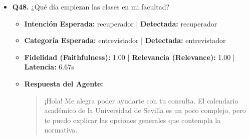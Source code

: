 \documentclass[12pt,a4paper,oneside]{report}
\begin{document}
\begin{itemize}
\begin{itemize}
\begin{quote}
¿Cuál es el tipo de curso que estás realizando (grado o máster)?
                \end{quote}
          \item \textbf{{Ground Truth (Referencia):}} \\
                \begin{quote}
Para poder indicarte el día exacto de inicio del periodo lectivo, necesito saber qué carrera o titulación estás cursando, ya que los calendarios específicos pueden variar según el centro o facultad.
                \end{quote}
          \item \textbf{{Referencias / Fuentes Utilizadas:}} \\
                \begin{itemize}
                  \item calendario-academico-2025-2026-cg.pdf (Página 2)
                  \item \href{https://cat.us.es/noticias/calendario-academico-curso-2024-25}{Calendario Académico Curso 2024-25 | Centro de Atención...}
                  \item \href{https://cat.us.es/noticias/calendario-academico-curso-2026-27}{Calendario Académico curso 2026-27 | Centro de Atención...}
                  \item calendario-academico-2025-2026-cg.pdf (Página 7)
                  \item calendario-academico-2025-2026-cg.pdf (Página 3)
                  \item \href{https://cat.us.es/noticias/calendario-academico-curso-2025-26}{Calendario Académico curso 2025-26 | Centro de Atención...}
                  \item matrícula 2025-26 (MATRUX)-v2\_020722025.pdf (Página 12)
                \end{itemize}
        \end{itemize}

  
\item \textbf{Q48.} ¿Qué día empiezan las clases en mi facultad? \\
        \begin{itemize}
          \item \textbf{Intención Esperada:} recuperador | \textbf{Detectada:} recuperador
          \item \textbf{Categoría Esperada:} entrevistador | \textbf{Detectada:} entrevistador
          \item \textbf{Fidelidad (Faithfulness):} 1.00 | \textbf{Relevancia (Relevance):} 1.00 | \textbf{Latencia:} 6.67s
          \item \textbf{{Respuesta del Agente:}} \\
                \begin{quote}
¡Hola! Me alegra poder ayudarte con tu consulta. El calendario académico de la Universidad de Sevilla es un poco complejo, pero te puedo explicar las opciones generales que contempla la normativa.


\end{quote}
\end{itemize}
\end{itemize}
\end{document}
